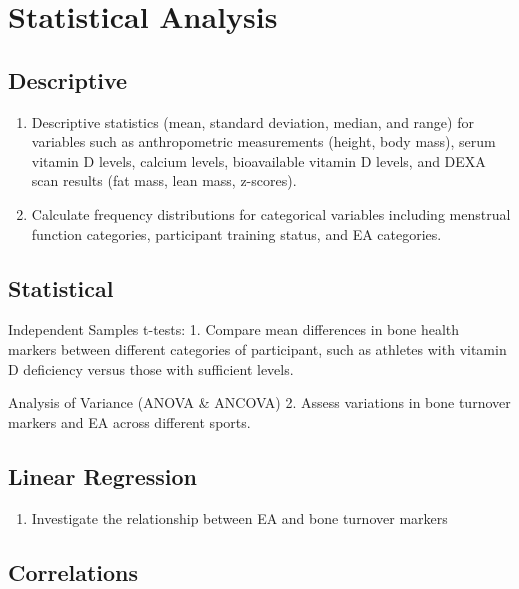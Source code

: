 \documentclass[
]{article}
\providecommand{\tightlist}{%
  \setlength{\itemsep}{0pt}\setlength{\parskip}{0pt}}
\begin{document}
\section{Statistical Analysis}\label{statistical-analysis}

\subsection{Descriptive}\label{descriptive}

\begin{enumerate}
\def\labelenumi{\arabic{enumi}.}
\item
  Descriptive statistics (mean, standard deviation, median, and range) for variables such as anthropometric measurements (height, body mass), serum vitamin D levels, calcium levels, bioavailable vitamin D levels, and DEXA scan results (fat mass, lean mass, z-scores).
\item
  Calculate frequency distributions for categorical variables including menstrual function categories, participant training status, and EA categories.
\end{enumerate}

\subsection{Statistical}\label{statistical}

Independent Samples t-tests:
1. Compare mean differences in bone health markers between different categories of participant, such as athletes with vitamin D deficiency versus those with sufficient levels.

Analysis of Variance (ANOVA \& ANCOVA)
2. Assess variations in bone turnover markers and EA across different sports.

\subsection{Linear Regression}\label{linear-regression}

\begin{enumerate}
\def\labelenumi{\arabic{enumi}.}
\tightlist
\item
  Investigate the relationship between EA and bone turnover markers
\end{enumerate}

\subsection{Correlations}\label{correlations}
\end{document}
